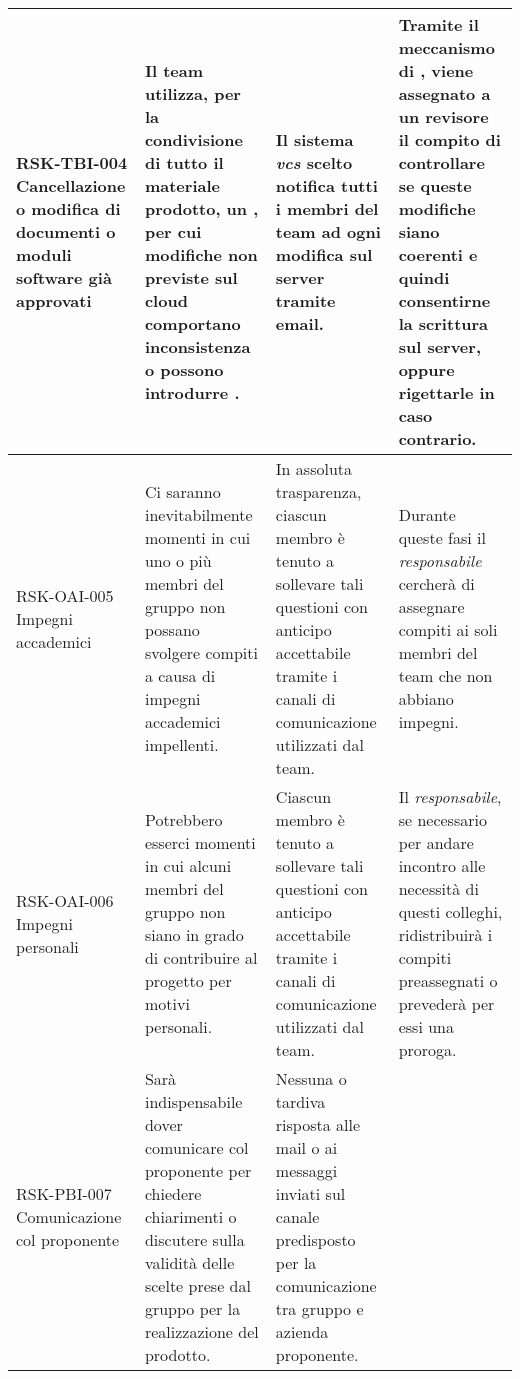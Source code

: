\begin{center}
\begin{longtable}{|p{3cm}|p{4cm}|p{3.5cm}|p{3.5cm}|}
		\hline
	RSK-TBI-004 \newline Cancellazione o modifica di documenti o moduli software già approvati & 
	Il team utilizza, per la condivisione di tutto il materiale prodotto, un \glock{vcs}, per cui modifiche non previste sul cloud comportano inconsistenza o possono introdurre \glock{regressioni}.
	&  Il sistema \textit{vcs} scelto notifica tutti i membri del team ad ogni modifica sul server tramite email.   
	 
	& Tramite il meccanismo di \glock{pull request}, viene assegnato a un revisore il compito di controllare se queste modifiche siano coerenti e quindi consentirne la scrittura sul server, oppure rigettarle in caso contrario.   \\
	\hline
	
		\hline
	RSK-OAI-005 \newline Impegni accademici & 
	Ci saranno inevitabilmente momenti in cui uno o più membri del gruppo non possano svolgere compiti a causa di impegni accademici impellenti.
	&  In assoluta trasparenza, ciascun membro è tenuto a sollevare tali questioni con anticipo accettabile tramite i canali di comunicazione utilizzati dal team.
	 
	& Durante queste fasi il \textit{responsabile} cercherà di assegnare compiti ai soli membri del team che non abbiano impegni. \\
	\hline
	
		\hline
	RSK-OAI-006 \newline Impegni personali & 
	Potrebbero esserci momenti in cui alcuni membri del gruppo non siano in grado di contribuire al progetto per motivi personali.
	&  Ciascun membro è tenuto a sollevare tali questioni con anticipo accettabile tramite i canali di comunicazione utilizzati dal team.
	 
	& Il \textit{responsabile}, se necessario per andare incontro alle necessità di questi colleghi, ridistribuirà i compiti preassegnati o prevederà per essi una proroga. \\
	\hline
	
		\hline
	RSK-PBI-007 \newline Comunicazione col proponente
	 & 
	Sarà indispensabile dover comunicare col proponente per chiedere chiarimenti o discutere sulla validità delle scelte prese dal gruppo per la realizzazione del prodotto.
	&  Nessuna o tardiva risposta alle mail o ai messaggi inviati sul canale \glock{slack} predisposto per la comunicazione tra gruppo e azienda proponente.
	 

\end{longtable}
\end{center}
